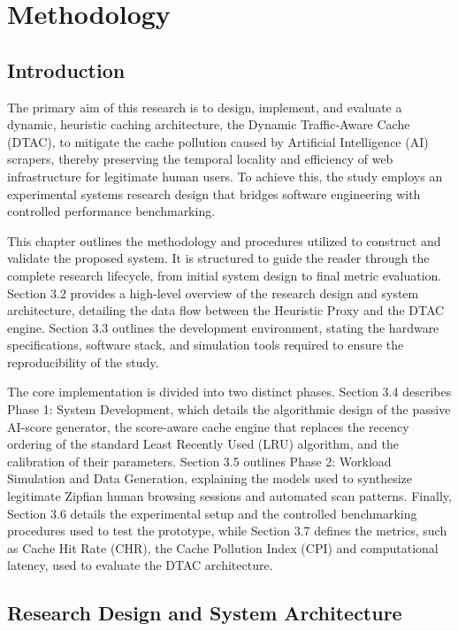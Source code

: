 \chapter{Methodology}
\label{chap:methodology}

\section{Introduction}
The primary aim of this research is to design, implement, and evaluate a dynamic, heuristic caching architecture, the Dynamic Traffic-Aware Cache (DTAC), to mitigate the cache pollution caused by Artificial Intelligence (AI) scrapers, thereby preserving the temporal locality and efficiency of web infrastructure for legitimate human users. To achieve this, the study employs an experimental systems research design that bridges software engineering with controlled performance benchmarking.

This chapter outlines the methodology and procedures utilized to construct and validate the proposed system. It is structured to guide the reader through the complete research lifecycle, from initial system design to final metric evaluation. Section 3.2 provides a high-level overview of the research design and system architecture, detailing the data flow between the Heuristic Proxy and the DTAC engine. Section 3.3 outlines the development environment, stating the hardware specifications, software stack, and simulation tools required to ensure the reproducibility of the study.

The core implementation is divided into two distinct phases. Section 3.4 describes Phase 1: System Development, which details the algorithmic design of the passive AI-score generator, the score-aware cache engine that replaces the recency ordering of the standard Least Recently Used (LRU) algorithm, and the calibration of their parameters. Section 3.5 outlines Phase 2: Workload Simulation and Data Generation, explaining the models used to synthesize legitimate Zipfian human browsing sessions and automated scan patterns. Finally, Section 3.6 details the experimental setup and the controlled benchmarking procedures used to test the prototype, while Section 3.7 defines the metrics, such as Cache Hit Rate (CHR), the Cache Pollution Index (CPI) and computational latency, used to evaluate the DTAC architecture.

\section{Research Design and System Architecture}

